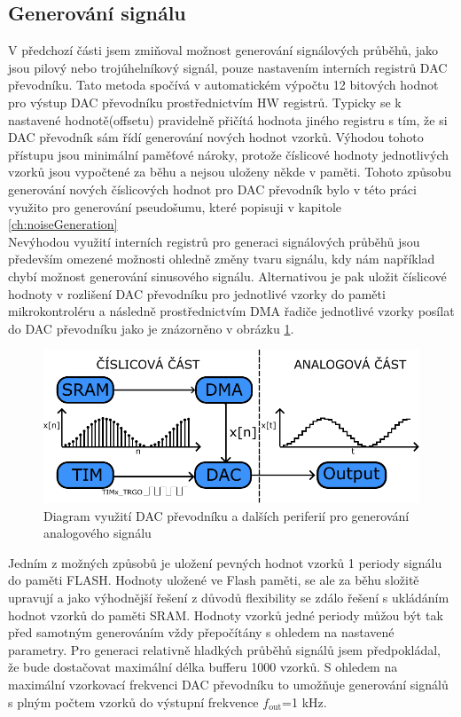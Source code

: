 \subsection{Generování signálu}
\label{ch:signalGeneration}
V předchozí části jsem zmiňoval možnost generování signálových průběhů, jako jsou  pilový nebo trojúhelníkový signál, pouze nastavením interních registrů DAC převodníku. Tato metoda spočívá v automatickém výpočtu 12 bitových hodnot pro výstup DAC převodníku prostřednictvím HW registrů. Typicky se k nastavené hodnotě(offsetu) pravidelně přičítá hodnota jiného registru s tím, že si DAC převodník sám řídí generování nových hodnot vzorků. Výhodou tohoto přístupu jsou minimální paměťové nároky, protože číslicové hodnoty jednotlivých vzorků jsou vypočtené za běhu a nejsou uloženy někde v paměti. Tohoto způsobu generování nových číslicových hodnot pro DAC převodník bylo v této práci využito pro generování pseudošumu, které popisuji v kapitole \ref{ch:noiseGeneration}\\

Nevýhodou využití interních registrů pro generaci signálových průběhů jsou především omezené možnosti ohledně změny tvaru signálu, kdy nám například chybí možnost generování sinusového signálu. Alternativou je pak uložit číslicové hodnoty v rozlišení DAC převodníku pro jednotlivé vzorky do paměti mikrokontroléru a následně prostřednictvím DMA řadiče jednotlivé vzorky posílat do DAC převodníku jako je znázorněno v obrázku \ref{fig:dacfunction}.\\

\begin{figure}[H]
	\centering
	\includegraphics[width=0.9\linewidth]{Figs/Diagrams/SVG/DAC_function}
	\caption{Diagram využití DAC převodníku a dalších periferií pro generování analogového signálu}
	\label{fig:dacfunction}
\end{figure}

 Jedním z možných způsobů je uložení pevných hodnot vzorků 1 periody signálu do paměti FLASH. Hodnoty uložené ve Flash paměti, se ale za běhu složitě upravují a jako výhodnější řešení z důvodů flexibility se zdálo řešení s ukládáním hodnot vzorků do paměti SRAM. Hodnoty vzorků jedné periody můžou být tak před samotným generováním vždy přepočítány s ohledem na nastavené parametry. Pro generaci relativně hladkých průběhů signálů jsem předpokládal, že bude dostačovat maximální délka bufferu 1000 vzorků. S ohledem na maximální vzorkovací frekvenci DAC převodníku to umožňuje generování signálů s plným počtem vzorků do výstupní frekvence $f_{\text{out}}$=1 kHz.


